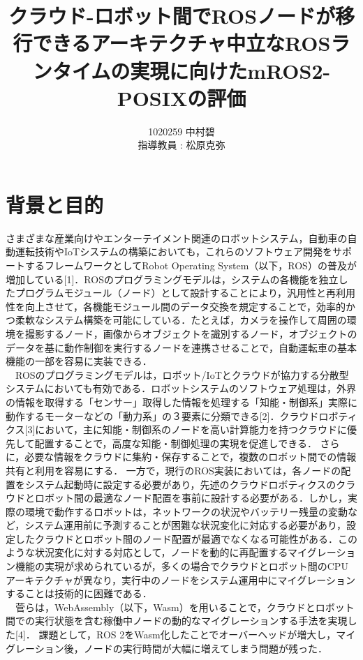 \documentclass[11pt]{ujarticle}
\author{%
1020259 中村碧\\指導教員 : 松原克弥
}
\title{クラウド-ロボット間でROSノードが移行できるアーキテクチャ中立なROSランタイムの実現に向けたmROS2-POSIXの評価}
\begin{document}
\maketitle

\section{背景と目的}
\label{sec:introduction}
さまざまな産業向けやエンターテイメント関連のロボットシステム，自動車の自動運転技術やIoTシステムの構築においても，これらのソフトウェア開発をサポートするフレームワークとしてRobot Operating System（以下，ROS）の普及が増加している[1]．ROSのプログラミングモデルは，システムの各機能を独立したプログラムモジュール（ノード）として設計することにより，汎用性と再利用性を向上させて，各機能モジュール間のデータ交換を規定することで，効率的かつ柔軟なシステム構築を可能にしている．たとえば，カメラを操作して周囲の環境を撮影するノード，画像からオブジェクトを識別するノード，オブジェクトのデータを基に動作制御を実行するノードを連携させることで，自動運転車の基本機能の一部を容易に実装できる．
\\　ROSのプログラミングモデルは，ロボット/IoTとクラウドが協力する分散型システムにおいても有効である．ロボットシステムのソフトウェア処理は，外界の情報を取得する「センサー」取得した情報を処理する「知能・制御系」実際に動作するモーターなどの「動力系」の３要素に分類できる[2]．クラウドロボティクス[3]において，主に知能・制御系のノードを高い計算能力を持つクラウドに優先して配置することで，高度な知能・制御処理の実現を促進しできる．
さらに，必要な情報をクラウドに集約・保存することで，複数のロボット間での情報共有と利用を容易にする．
一方で，現行のROS実装においては，各ノードの配置をシステム起動時に設定する必要があり，先述のクラウドロボティクスのクラウドとロボット間の最適なノード配置を事前に設計する必要がある．しかし，実際の環境で動作するロボットは，ネットワークの状況やバッテリー残量の変動など，システム運用前に予測することが困難な状況変化に対応する必要があり，設定したクラウドとロボット間のノード配置が最適でなくなる可能性がある．このような状況変化に対する対応として，ノードを動的に再配置するマイグレーション機能の実現が求められているが，多くの場合でクラウドとロボット間のCPUアーキテクチャが異なり，実行中のノードをシステム運用中にマイグレーションすることは技術的に困難である．
\\　菅らは，WebAssembly（以下，Wasm）を用いることで，クラウドとロボット間での実行状態を含む稼働中ノードの動的なマイグレーションする手法を実現した[4]．
課題として，ROS 2をWasm化したことでオーバーヘッドが増大し，マイグレーション後，ノードの実行時間が大幅に増えてしまう問題が残った．
\end{document}
